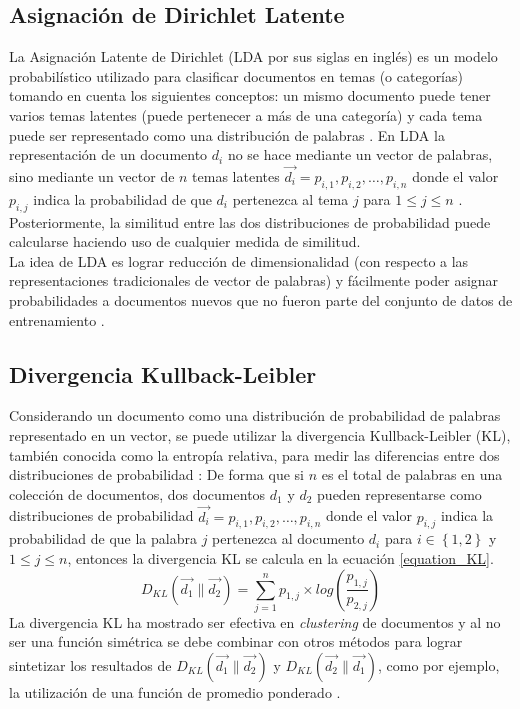 \subsection{Asignación de Dirichlet Latente}
La Asignación Latente de Dirichlet (LDA por sus siglas en inglés) es un modelo probabilístico utilizado para clasificar documentos en temas (o categorías) tomando en cuenta los siguientes conceptos: un mismo documento puede tener varios temas latentes (puede pertenecer a más de una categoría) y cada tema puede ser representado como una distribución de palabras \cite{bae2014computing}. En LDA la representación de un documento ${d_{i}}$ no se hace mediante un vector de palabras, sino mediante un vector de $n$ temas latentes ${\vec{d_{i}}=p_{i,1}, p_{i,2},…, p_{i,n}}$ donde el valor ${p_{i,j}}$ indica la probabilidad de que ${d_{i}}$ pertenezca al tema $j$ para ${1 \leq  j \leq  n}$ \cite{ bae2014computing, aggarwal2015data}. Posteriormente, la similitud entre las dos distribuciones de probabilidad puede calcularse haciendo uso de cualquier medida de similitud.\\
La idea de LDA es lograr reducción de dimensionalidad (con respecto a las representaciones tradicionales de vector de palabras) y fácilmente poder asignar probabilidades a documentos nuevos que no fueron parte del conjunto de datos de entrenamiento \cite{aggarwal2015data}.

\subsection{Divergencia Kullback-Leibler }
Considerando un documento como una distribución de probabilidad de palabras representado en un vector, se puede utilizar la divergencia Kullback-Leibler  (KL), también conocida como la entropía relativa, para medir las diferencias entre dos distribuciones de probabilidad \cite{huang2008similarity}: De forma que si $n$ es el total de palabras en una colección de documentos, dos documentos ${d_{1}}$ y ${d_{2}}$ pueden representarse como distribuciones de probabilidad ${\vec{d_{i}}=p_{i,1}, p_{i,2},…, p_{i,n}}$ donde el valor ${p_{i,j}}$ indica la probabilidad de que la palabra $j$ pertenezca al documento ${d_{i}}$ para ${i \in \left \{ 1,2 \right \}}$ y ${1 \leq  j \leq  n}$, entonces la divergencia KL se calcula en la ecuación \ref{equation_KL}.
\begin{equation}
\label{equation_KL}
D_{KL}(\vec{d_{1}}\parallel\vec{d_{2}})=\sum_{j=1}^{n}{p_{1,j}\times log(\frac{p_{1,j}}{p_{2,j}})}
\end{equation}
La divergencia KL ha mostrado ser efectiva en \textit{clustering} de documentos y al no ser una función simétrica se debe combinar con otros métodos para lograr sintetizar los resultados de ${ D_{KL}(\vec{d_{1}}\parallel\vec{d_{2}})}$ y ${ D_{KL}(\vec{d_{2}}\parallel\vec{d_{1}})}$, como por ejemplo, la utilización de una función de promedio ponderado \cite{huang2008similarity}.\\\\

